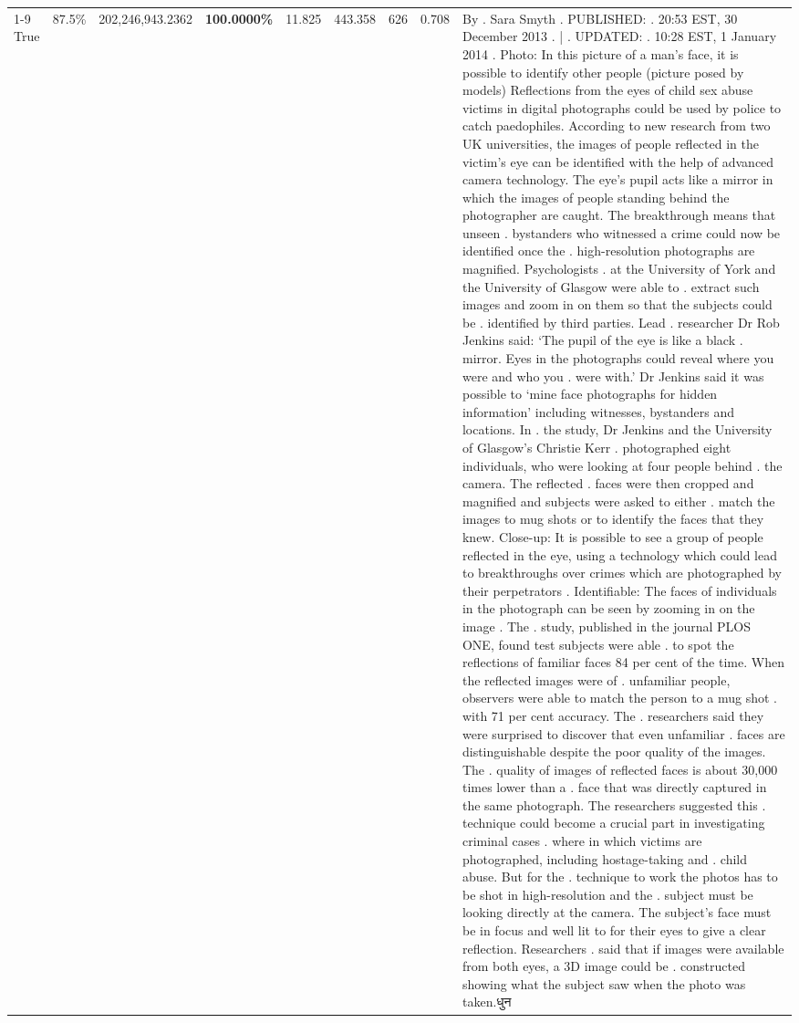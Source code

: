 \begin{table}[H]
\begin{tabular}{lllrlllll}
\cline{1-9}
True & 87.5\% & 202,246,943.2362 & \bfseries \color{red} 100.0000\% & 11.825 & 443.358 & 626 & 0.708 & By . Sara Smyth . PUBLISHED: . 20:53 EST, 30 December 2013 . | . UPDATED: . 10:28 EST, 1 January 2014 . Photo: In this picture of a man's face, it is possible to identify other people (picture posed by models) Reflections from the eyes of child sex abuse victims in digital photographs could be used by police to catch paedophiles. According to new research from two UK universities, the images of people reflected in the victim's eye can be identified with the help of advanced camera technology. The eye's pupil acts like a mirror in which the images of people standing behind the photographer are caught. The breakthrough means that unseen . bystanders who witnessed a crime could now be identified once the . high-resolution photographs are magnified. Psychologists . at the University of York and the University of Glasgow were able to . extract such images and zoom in on them so that the subjects could be . identified by third parties. Lead . researcher Dr Rob Jenkins said: ‘The pupil of the eye is like a black . mirror. Eyes in the photographs could reveal where you were and who you . were with.' Dr Jenkins said it was possible to ‘mine face photographs for hidden information' including witnesses, bystanders and locations. In . the study, Dr Jenkins and the University of Glasgow's Christie Kerr . photographed eight individuals, who were looking at four people behind . the camera. The reflected . faces were then cropped and magnified and subjects were asked to either . match the images to mug shots or to identify the faces that they knew. Close-up: It is possible to see a group of people reflected in the eye, using a technology which could lead to breakthroughs over crimes which are photographed by their perpetrators . Identifiable: The faces of individuals in the photograph can be seen by zooming in on the image . The . study, published in the journal PLOS ONE, found test subjects were able . to spot the reflections of familiar faces 84 per cent of the time. When the reflected images were of . unfamiliar people, observers were able to match the person to a mug shot . with 71 per cent accuracy. The . researchers said they were surprised to discover that even unfamiliar . faces are distinguishable despite the poor quality of the images. The . quality of images of reflected faces is about 30,000 times lower than a . face that was directly captured in the same photograph. The researchers suggested this . technique could become a crucial part in investigating criminal cases . where in which victims are photographed, including hostage-taking and . child abuse. But for the . technique to work the photos has to be shot in high-resolution and the . subject must be looking directly at the camera. The subject's face must be in focus and well lit to for their eyes to give a clear reflection. Researchers . said that if images were available from both eyes, a 3D image could be . constructed showing what the subject saw when the photo was taken.धुन \\

\end{tabular}
\end{table}
